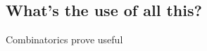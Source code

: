 \begin{refsection}
   \section{What's the use of all this?}
   Combinatorics prove useful 


\printbibliography[heading=subbibliography]
\end{refsection}
   


